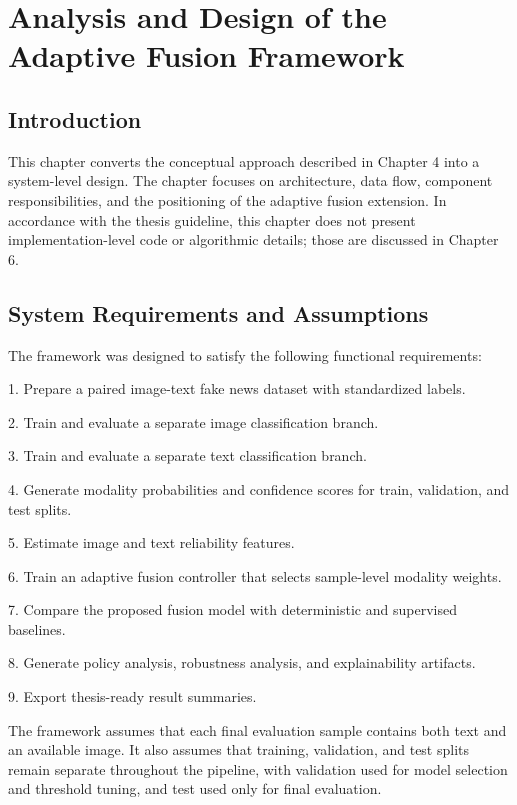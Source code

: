 \chapter{Analysis and Design of the Adaptive Fusion Framework}


\section{Introduction}


This chapter converts the conceptual approach described in Chapter 4 into a system-level design. The chapter focuses on architecture, data flow, component responsibilities, and the positioning of the adaptive fusion extension. In accordance with the thesis guideline, this chapter does not present implementation-level code or algorithmic details; those are discussed in Chapter 6.


\section{System Requirements and Assumptions}


The framework was designed to satisfy the following functional requirements:


1. Prepare a paired image-text fake news dataset with standardized labels.

2. Train and evaluate a separate image classification branch.

3. Train and evaluate a separate text classification branch.

4. Generate modality probabilities and confidence scores for train, validation, and test splits.

5. Estimate image and text reliability features.

6. Train an adaptive fusion controller that selects sample-level modality weights.

7. Compare the proposed fusion model with deterministic and supervised baselines.

8. Generate policy analysis, robustness analysis, and explainability artifacts.

9. Export thesis-ready result summaries.


The framework assumes that each final evaluation sample contains both text and an available image. It also assumes that training, validation, and test splits remain separate throughout the pipeline, with validation used for model selection and threshold tuning, and test used only for final evaluation.


